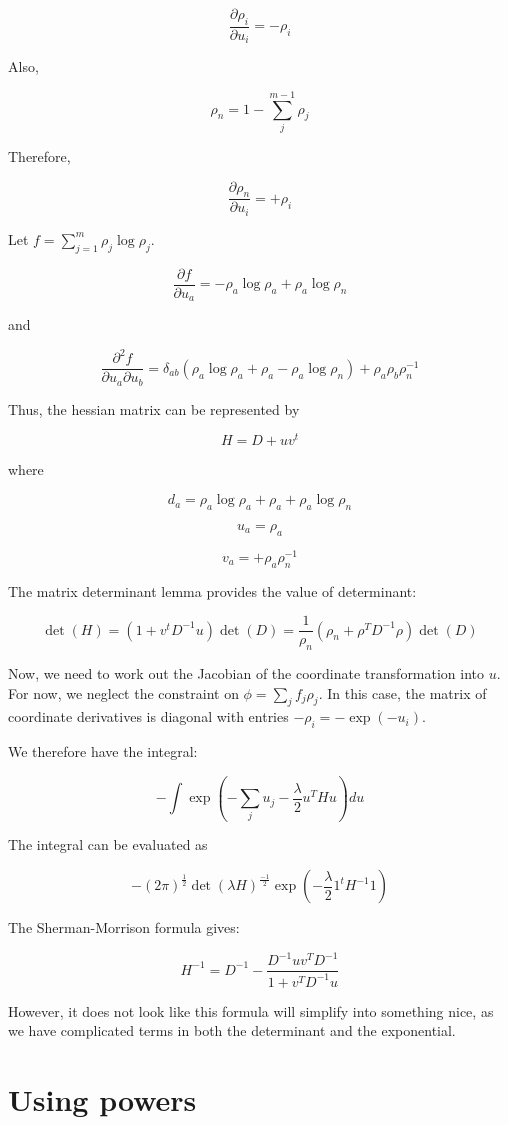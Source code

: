 \documentclass[12pt]{article}
\begin{document}
$$\frac{\partial \rho_i}{\partial u_i} = - \rho_i$$

Also, 

$$\rho_n = 1 - \sum_j^{m-1} \rho_j$$

Therefore, 

$$\frac{\partial \rho_n}{\partial u_i} = + \rho_i$$

Let $f = \sum_{j=1}^m \rho_j \log \rho_j$.  

$$\frac{\partial f}{\partial u_a} =  - \rho_a \log \rho_a + \rho_a \log \rho_n$$

and 

$$\frac{\partial^2 f}{\partial u_a \partial u_b} =  \delta_{ab}(\rho_a \log \rho_a + \rho_a - \rho_a \log \rho_n) + \rho_a \rho_b \rho_n^{-1}$$

Thus, the hessian matrix can be represented by

$$H = D + u v^t$$

where 

$$d_a = \rho_a \log \rho_a + \rho_a + \rho_a \log \rho_n$$

$$u_a = \rho_a$$

$$v_a = +\rho_a \rho_n^{-1}$$

The matrix determinant lemma provides the value of determinant:

$$\det(H) = (1 + v^t D^{-1} u) \det(D) = \frac{1}{\rho_n} (\rho_n + \rho^T D^{-1} \rho) \det(D)$$

Now, we need to work out the Jacobian of the coordinate transformation into $u$.  For now, we neglect the constraint on $\phi = \sum_j f_j \rho_j$.  In this case, the matrix of coordinate derivatives is diagonal with entries $-\rho_i = -\exp(-u_i)$.  

We therefore have the integral:

$$-\int \exp(- \sum_j u_j -\frac{\lambda}{2} u^T H u) du $$

The integral can be evaluated as 

$$- (2\pi)^{\frac{1}{2}} \det(\lambda H)^{\frac{-1}{2}} \exp(-\frac{\lambda}{2} 1^t H^{-1} 1)$$

The Sherman-Morrison formula gives:

$$H^{-1} = D^{-1} - \frac{D^{-1} u v^T D^{-1}}{1 + v^T D^{-1} u}$$

However, it does not look like this formula will simplify into something nice, as we have complicated terms in both the determinant and the exponential.

\section{Using powers}
\end{document}
